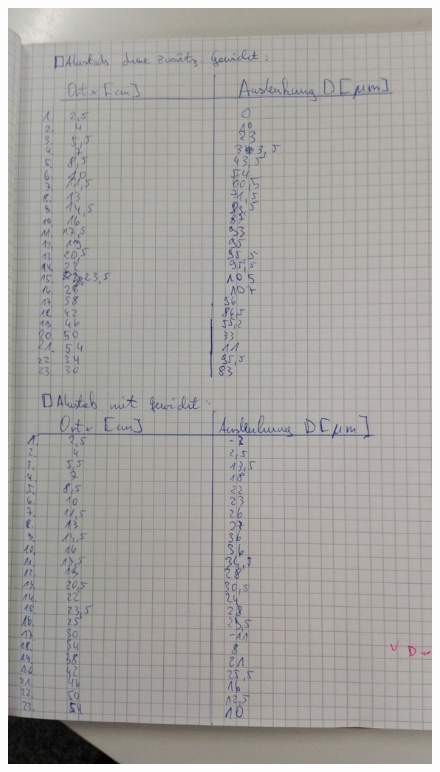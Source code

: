 \documentclass[
  bibliography=totoc,     %
  captions=tableheading,  %
  titlepage=firstiscover, %
]{scrartcl}
\begin{document}
\begin{figure}[H]
    \includegraphics[width=1\textwidth]{V1036.jpeg}
    \label{fig:1036}
\end{figure}
\end{document}
